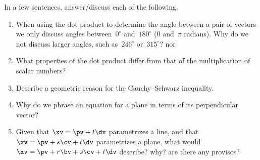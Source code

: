 \begin{exercise}  
In a few sentences, answer\slash discuss each of the following.
\begin{enumerate}
\item When using the dot product to determine the angle between a pair of vectors we only discuss angles between~\(0^\circ\) and~\(180^\circ\) (\(0\) and~\(\pi\) radians).  
Why do we not discuss larger angles, such as~\(246^\circ\) or~\(315^\circ\)? nor 

\item What properties of the dot product differ from that of the multiplication of scalar numbers?

\item Describe a geometric reason for the Cauchy--Schwarz inequality.

\item Why do we phrase an equation for a plane in terms of its perpendicular vector?

\item Given that \(\xv=\pv+t\dv\) parametrizes a line, and that \(\xv=\pv+s\cv+t\dv\) parametrizes a plane, what would \(\xv=\pv+r\bv+s\cv+t\dv\) describe? why? are there any provisos?

\end{enumerate}
\end{exercise}

\begin{comment}%
why, what caused X?
how did X occur?
what-if? what-if-not?
how does X compare with Y?
what is the evidence for X?
why is X important?
\end{comment}


